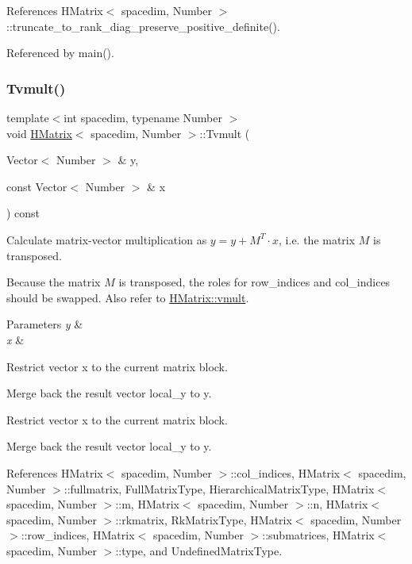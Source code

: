 References H\+Matrix$<$ spacedim, Number $>$\+::truncate\+\_\+to\+\_\+rank\+\_\+diag\+\_\+preserve\+\_\+positive\+\_\+definite().



Referenced by main().

\mbox{\label{classHMatrix_a72e5255eb5ce46136d0e2b195c82f016}} 
\subsubsection{\texorpdfstring{Tvmult()}{Tvmult()}\hspace{0.1cm}{\footnotesize\ttfamily [1/4]}}
{\footnotesize\ttfamily template$<$int spacedim, typename Number $>$ \\
void \hyperlink{classHMatrix}{H\+Matrix}$<$ spacedim, Number $>$\+::Tvmult (\begin{DoxyParamCaption}\item[{Vector$<$ Number $>$ \&}]{y,  }\item[{const Vector$<$ Number $>$ \&}]{x }\end{DoxyParamCaption}) const}

Calculate matrix-\/vector multiplication as $y = y + M^T \cdot x$, i.\+e. the matrix $M$ is transposed.

Because the matrix $M$ is transposed, the roles for {\ttfamily row\+\_\+indices} and {\ttfamily col\+\_\+indices} should be swapped. Also refer to \hyperlink{classHMatrix_aa11b5761aba86606effd14b4bdf31912}{H\+Matrix\+::vmult}. 
\begin{DoxyParams}{Parameters}
{\em y} & \\
\hline
{\em x} & \\
\hline
\end{DoxyParams}
Restrict vector x to the current matrix block.

Merge back the result vector {\ttfamily local\+\_\+y} to {\ttfamily y}.

Restrict vector x to the current matrix block.

Merge back the result vector {\ttfamily local\+\_\+y} to {\ttfamily y}.

References H\+Matrix$<$ spacedim, Number $>$\+::col\+\_\+indices, H\+Matrix$<$ spacedim, Number $>$\+::fullmatrix, Full\+Matrix\+Type, Hierarchical\+Matrix\+Type, H\+Matrix$<$ spacedim, Number $>$\+::m, H\+Matrix$<$ spacedim, Number $>$\+::n, H\+Matrix$<$ spacedim, Number $>$\+::rkmatrix, Rk\+Matrix\+Type, H\+Matrix$<$ spacedim, Number $>$\+::row\+\_\+indices, H\+Matrix$<$ spacedim, Number $>$\+::submatrices, H\+Matrix$<$ spacedim, Number $>$\+::type, and Undefined\+Matrix\+Type.



